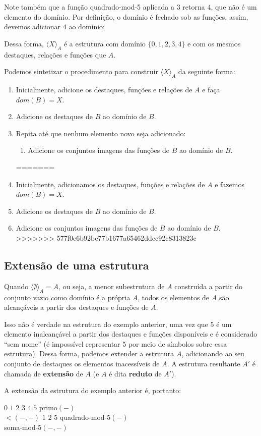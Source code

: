 Note também que a função quadrado-mod-5 aplicada a $3$ retorna $4$, que não é um elemento do domínio. Por definição, o domínio é fechado sob as funções, assim, devemos adicionar $4$ ao domínio:

\begin{center}
\end{center}

Dessa forma, $\langle X \rangle_A$ é a estrutura com domínio $\{0,1,2,3,4\}$ e com os mesmos destaques, relações e funções que $A$. 

Podemos sintetizar o procedimento para construir $\langle X \rangle_A$ da seguinte forma:
\begin{enumerate}
<<<<<<< HEAD
    \item Inicialmente, adicione os destaques, funções e relações de $A$ e faça $dom(B) = X$.
    \item Adicione os destaques de $B$ ao domínio de $B$.
    \item Repita até que nenhum elemento novo seja adicionado:
    \begin{enumerate}
        \item Adicione os conjuntos imagens das funções de $B$ ao domínio de $B$.
    \end{enumerate}  
=======
    \item Inicialmente, adicionamos os destaques, funções e relações de $A$ e fazemos $dom(B) = X$.
    \item Adicione os destaques de $B$ ao domínio de $B$.
    \item Adicione os conjuntos imagens das funções de $B$ ao domínio de $B$.  
>>>>>>> 577f0e6b92bc77b1677a65462ddcc92c8313823c
\end{enumerate}

\subsection{Extensão de uma estrutura}

Quando $\langle \emptyset \rangle_A = A$, ou seja, a menor subestrutura de $A$ construída a partir do conjunto vazio como domínio é a própria $A$, todos os elementos de $A$ são alcançáveis a partir dos destaques e funções de $A$.

Isso não é verdade na estrutura do exemplo anterior, uma vez que $5$ é um elemento inalcançável a partir dos destaques e funções disponíveis e é considerado ``sem nome'' (é impossível representar 5 por meio de símbolos sobre essa estrutura). Dessa forma, podemos extender a estrutura $A$, adicionando ao seu conjunto de destaques os elementos inacessíveis de $A$. A estrutura resultante $A'$ é chamada de \textbf{extensão} de $A$ (e $A$ é dita \textbf{reduto} de $A'$).
    
A extensão da estrutura do exemplo anterior é, portanto:
\begin{center}
    \begin{structure}
        {}
        {$0$ $1$ $2$ $3$ $4$ $5$}
        {primo$(-)$\\$<$$(-,-)$}
        {$1$ $2$ $5$}
        {quadrado-mod-5$(-)$\\soma-mod-5$(-,-)$}
    \end{structure} 
\end{center}